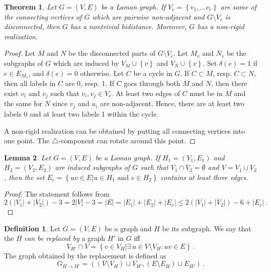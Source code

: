 \documentclass[a4paper, 11pt]{article}
\newcommand{\trcomp}{$\triangle$-component}
\newtheorem{thm}{Theorem}[section]
\newtheorem{lem}[thm]{Lemma}
\theoremstyle{definition}
\newtheorem{defn}{Definition}[section]
\begin{document}
\begin{thm}
\label{thm:cutByVertices}
Let $G=(V,E)$ be a Laman graph. If $V_{c}=\left\{v_1, \dots v_r\right\}$ are some of the connecting vertices of $G$ which are pairwise non-adjacent and $G\setminus V_c$ is disconnected, then $G$ has a nontrivial bidistance. Moreover, $G$ has a non-rigid realization.
\end{thm}
\begin{proof}
Let $M$ and $N$ be the disconnected parts of $G\setminus V_c$. Let $M_v$ and $N_v$ be the subgraphs of $G$ which are induced by $V_M\cup \left\{v\right\}$ and $V_N\cup \left\{v\right\}$. Set $\delta(e)=1$ if $e\in E_{M_v}$, and $\delta(e)=0$ otherwise. Let $C$ be a cycle in $G$. If $C \subset M$, resp. $C \subset N$, then all labels in $C$ are 0, resp. 1. If $C$ goes through both $M$ and $N$, then there exist $v_i$ and $v_j$ such that $v_i, v_j\in V_c$. At least two edges of $C$ must be in $M$ and the same for $N$ since $v_j$ and $u_i$ are non-adjacent. Hence, there are at least two labels 0 and at least two labels 1 within the cycle.

A non-rigid realization can be obtained by putting all connecting vertices into one point. The \trcomp{} can rotate around this point.
\end{proof}

\begin{lem}
\label{lem:numEdgesBetweenTwoParts}
Let $G=(V,E)$ be a Laman graph. If $H_1=(V_1,E_1)$ and $H_2=(V_2,E_2)$ are induced subgraphs of $G$ such that $V_1 \cap V_2=\emptyset$ and $V=V_1\cup V_2$, then the set $E_c=\left\{uv\in E | u\in H_1 \text{ and } v\in H_2\right\}$ contains at least three edges.
\end{lem}
\begin{proof}
The statement follows from
$$
2(|V_1|+|V_2|)-3=2|V|-3=|E|=|E_1|+|E_2|+|E_c| \leq 2(|V_1|+|V_2|)-6 +|E_c|\,.
$$
\end{proof}

\begin{defn}
Let $G=(V,E)$ be a graph and $H$ be its subgraph. We say that the $H$ \emph{can be replaced by} a graph $H'$ in $G$ iff
$$
V_{H'}\cap V=\left\{v\in V_H | \exists\, u\in V\setminus V_H \colon uv\in E\right\}\,.
$$
The graph obtained by the replacement is defined as
$$
G_{H\rightarrow H'}=\left((V\setminus V_H)\cup V_{H'}, (E\setminus E_H)\cup E_{H'}\right)\,.
$$
\end{defn}
\end{document}
